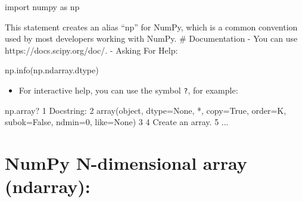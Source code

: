 \documentclass[11pt]{article}
\providecommand{\tightlist}{%
      \setlength{\itemsep}{0pt}\setlength{\parskip}{0pt}}
\newenvironment{Shaded}{}{}
\newcommand{\DecValTok}[1]{\textcolor[rgb]{0.25,0.63,0.44}{{#1}}}
\newcommand{\StringTok}[1]{\textcolor[rgb]{0.25,0.44,0.63}{{#1}}}
\newcommand{\NormalTok}[1]{{#1}}
\newcommand{\ImportTok}[1]{{#1}}
\newcommand{\VariableTok}[1]{\textcolor[rgb]{0.10,0.09,0.49}{{#1}}}
\newcommand{\OperatorTok}[1]{\textcolor[rgb]{0.40,0.40,0.40}{{#1}}}
\newcommand{\BuiltInTok}[1]{{#1}}
\begin{document}
\begin{Shaded}
\begin{Highlighting}[]
\ImportTok{import}\NormalTok{ numpy }\ImportTok{as}\NormalTok{ np}
\end{Highlighting}
\end{Shaded}

This statement creates an alias ``np'' for NumPy, which is a common
convention used by most developers working with NumPy. \# Documentation
- You can use https://docs.scipy.org/doc/. - Asking For Help:

\begin{Shaded}
\begin{Highlighting}[]
\NormalTok{np.info(np.ndarray.dtype)}
\end{Highlighting}
\end{Shaded}

\begin{itemize}
\tightlist
\item
  For interactive help, you can use the symbol \texttt{?}, for example:
\end{itemize}

\begin{Shaded}
\begin{Highlighting}[]
\NormalTok{np.array?}
\DecValTok{1}\NormalTok{ Docstring:}
\DecValTok{2}\NormalTok{ array(}\BuiltInTok{object}\NormalTok{, dtype}\OperatorTok{=}\VariableTok{None}\NormalTok{, }\OperatorTok{*}\NormalTok{, copy}\OperatorTok{=}\VariableTok{True}\NormalTok{, order}\OperatorTok{=}\StringTok{\textquotesingle{}K\textquotesingle{}}\NormalTok{, subok}\OperatorTok{=}\VariableTok{False}\NormalTok{, ndmin}\OperatorTok{=}\DecValTok{0}\NormalTok{, like}\OperatorTok{=}\VariableTok{None}\NormalTok{)}
\DecValTok{3} 
\DecValTok{4}\NormalTok{ Create an array.}
\DecValTok{5}\NormalTok{ ...}
\end{Highlighting}
\end{Shaded}

\hypertarget{numpy-n-dimensional-array-ndarray}{%
\section{NumPy N-dimensional array
(ndarray):}\label{numpy-n-dimensional-array-ndarray}}
\end{document}
